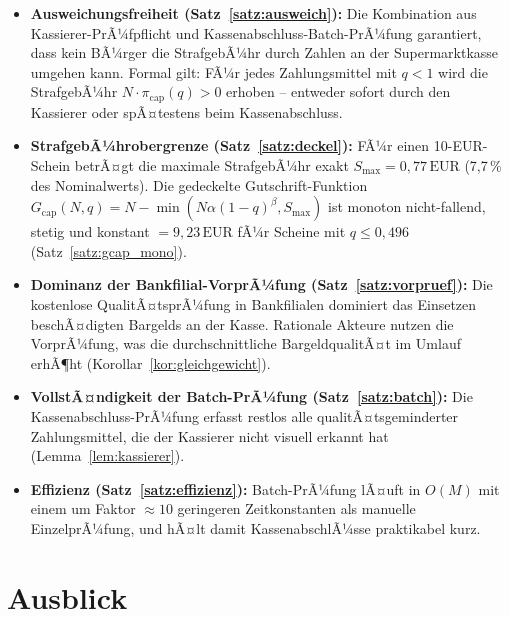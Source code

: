 ﻿\documentclass[a4paper,12pt]{article}
\theoremstyle{definition}
\begin{document}
\begin{itemize}
  \item \textbf{Ausweichungsfreiheit (Satz~\ref{satz:ausweich}):}
        Die Kombination aus Kassierer-PrÃ¼fpflicht und Kassenabschluss-Batch-PrÃ¼fung
        garantiert, dass kein BÃ¼rger die StrafgebÃ¼hr durch Zahlen an der
        Supermarktkasse umgehen kann.  Formal gilt: FÃ¼r jedes Zahlungsmittel
        mit $q < 1$ wird die StrafgebÃ¼hr $N \cdot \pi_{\text{cap}}(q) > 0$ erhoben --
        entweder sofort durch den Kassierer oder spÃ¤testens beim Kassenabschluss.
  \item \textbf{StrafgebÃ¼hrobergrenze (Satz~\ref{satz:deckel}):}
        FÃ¼r einen 10-EUR-Schein betrÃ¤gt die maximale StrafgebÃ¼hr exakt
        $S_{\max} = 0{,}77\,\text{EUR}$ (7,7\,\% des Nominalwerts).
        Die gedeckelte Gutschrift-Funktion $G_{\text{cap}}(N,q) = N - \min(N\alpha(1-q)^{\beta}, S_{\max})$
        ist monoton nicht-fallend, stetig und konstant $= 9{,}23\,\text{EUR}$
        fÃ¼r Scheine mit $q \leq 0{,}496$ (Satz~\ref{satz:gcap_mono}).
  \item \textbf{Dominanz der Bankfilial-VorprÃ¼fung (Satz~\ref{satz:vorpruef}):}
        Die kostenlose QualitÃ¤tsprÃ¼fung in Bankfilialen dominiert das Einsetzen
        beschÃ¤digten Bargelds an der Kasse.  Rationale Akteure nutzen die
        VorprÃ¼fung, was die durchschnittliche BargeldqualitÃ¤t im Umlauf erhÃ¶ht
        (Korollar~\ref{kor:gleichgewicht}).
  \item \textbf{VollstÃ¤ndigkeit der Batch-PrÃ¼fung (Satz~\ref{satz:batch}):}
        Die Kassenabschluss-PrÃ¼fung erfasst restlos alle qualitÃ¤tsgeminderter
        Zahlungsmittel, die der Kassierer nicht visuell erkannt hat
        (Lemma~\ref{lem:kassierer}).
  \item \textbf{Effizienz (Satz~\ref{satz:effizienz}):}
        Batch-PrÃ¼fung lÃ¤uft in $O(M)$ mit einem um Faktor $\approx 10$
        geringeren Zeitkonstanten als manuelle EinzelprÃ¼fung,
        und hÃ¤lt damit KassenabschlÃ¼sse praktikabel kurz.
\end{itemize}

\section{Ausblick}
\label{sec:ausblick}
\end{document}
